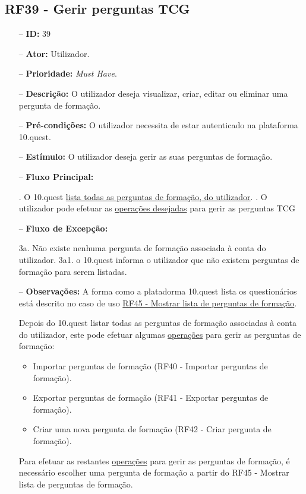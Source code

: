 \subsection{RF39 - Gerir perguntas TCG}
\begin{itemize}
	\item[--] \textbf{ID:} 39
	\item[--]  \textbf{Ator:} Utilizador.
	\item[--]  \textbf{Prioridade:} \textit{Must Have}.
	\item[--]  \textbf{Descrição:} O utilizador deseja visualizar, criar, editar ou eliminar uma pergunta de formação.
	\item[--]  \textbf{Pré-condições:} O utilizador necessita de estar autenticado na plataforma 10.quest.
	\item[--]  \textbf{Estímulo:} O utilizador deseja gerir as suas perguntas de formação.
	\item[--]  \textbf{Fluxo Principal:} 
		\begin{comment}
		\subitem 1. O utilizador pressiona o botão Perguntas TCG.
		\subitem 2. O 10.quest efetua um pedido da lista de perguntas TCG ao TCG, associadas à conta do utilizador.
		\end{comment}
		. O 10.quest  \underline{lista todas as perguntas de formação, do utilizador}.
		. O utilizador pode efetuar as \underline{operações desejadas} para gerir as perguntas TCG
	\item[--]  \textbf{Fluxo de Excepção:} 
		\begin{comment}
		\subitem 2a. O 10.quest não consegue efetuar o pedido à API do TCG devido a uma falha na conexão.
		\subitem 2a1. O 10.quest notifica o utilizador que ocorreu uma falha na conexão.
		\subitem 2b. O serviço do TCG (API) está indisponível.
		\subitem 2b1. O 10.quest notifica o utilizador que o serviço do TCG está temporariamente indisponível. 
		\end{comment}
		\subitem 3a. Não existe nenhuma pergunta de formação associada à conta do utilizador.
		\subitem 3a1. o 10.quest informa o utilizador que não existem perguntas de formação para serem listadas.
	\item[--]  \textbf{Observações:} A forma como a platadorma 10.quest lista os questionários está descrito no caso de uso \underline{RF45 - Mostrar lista de perguntas de formação}.
	
	Depois do 10.quest listar todas as perguntas de formação associadas à conta do utilizador, este pode efetuar algumas \underline{operações} para gerir as perguntas de formação:
	\begin{itemize}
		\item Importar perguntas de formação (RF40 - Importar perguntas de formação).
		\item Exportar perguntas de formação (RF41 - Exportar perguntas de formação).
		\item Criar uma nova pergunta de formação (RF42 - Criar pergunta de formação).
	\end{itemize}
	Para efetuar as restantes \underline{operações}  para gerir as perguntas de formação, é necessário escolher uma pergunta de formação a partir do RF45 - Mostrar lista de perguntas de formação.
\end{itemize}
